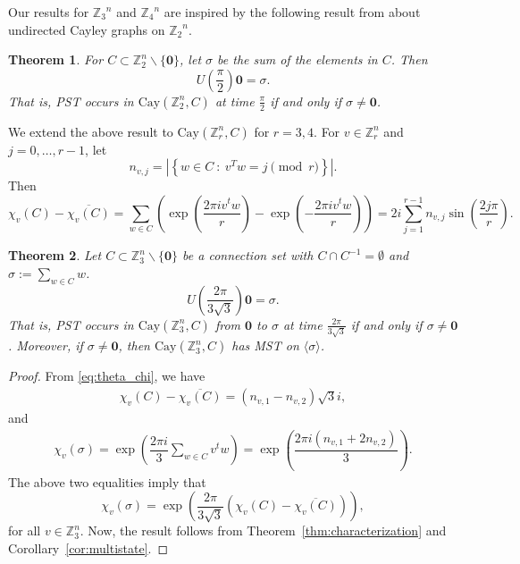 \documentclass{amsart}
\theoremstyle{plain}
\newtheorem{theorem}{Theorem}[section]
\theoremstyle{remark}\newtheorem{con}[theorem]{Construction}
\theoremstyle{remark} \newtheorem*{remark}{Remark}
\theoremstyle{remark} \newtheorem{example}{Example}
\newcommand{\bb}{\mathbb}
\newcommand{\mrm}{\mathrm}
\newcommand{\mbf}{\mathbf}
\newcommand{\ov}{\overline}
\begin{document}
Our results for ${\mathbb Z_3}^n$ and ${\mathbb Z_4}^n$
are inspired by the following result from \cite{CheungGodsil} about undirected Cayley graphs on  ${\mathbb Z_2}^n$.
\begin{theorem}
For $C \subset \bb{Z}_2^n \backslash \{\mbf{0}\}$, let $\sigma$ be the sum of the elements in $C$.  Then 
\begin{equation*}
    U\left(\frac{\pi}{2}\right) \mbf{0} = \sigma.
\end{equation*}
That is, PST occurs  in $\mrm{Cay}(\bb{Z}_2^n, C)$ at time $\frac{\pi}{2}$ if and only if $\sigma \neq \mbf{0}$.
\end{theorem}
We extend the above result to $\mrm{Cay}\left(\bb{Z}_r^n, C\right)$ for $r=3, 4$.
For $v\in \bb{Z}_r^n$ and $j=0,\ldots,r-1$, let
\begin{equation*}
    n_{v,j} = \left\vert \left\{w \in C \ :\ v^Tw = j \pmod{r}\right\}\right\vert.
\end{equation*}
Then
\begin{equation}\label{eq:theta_chi}
  \chi_{v}(C)-\ov{\chi_{v}(C)} =\sum\limits_{ w \in C} \left(\exp\left( \dfrac{2\pi i v^{t}w}{r} \right)- \exp\left(-\dfrac{2\pi i v^{t}w}{r}\right) \right)= 2 i \sum_{j=1}^{r-1}  n_{v,j} \sin\left(\dfrac{2j \pi}{r}\right).  
\end{equation}
\begin{theorem}
Let $C \subset \bb{Z}_{3}^{n} \backslash \{\mbf{0}\}$ be a connection set with $C \cap C^{-1}=\emptyset$ and $\sigma:=\sum\limits_{w \in C} w$. 
\begin{equation*}
    U\left(\frac{2\pi}{3\sqrt{3}}\right) \mbf{0} = \sigma.
\end{equation*}
That is, PST occurs in $\mrm{Cay}(\bb{Z}_3^n, C)$ from $\mbf{0}$ to $\sigma$ at time $\frac{2\pi}{3\sqrt{3}}$ if and only if $\sigma \neq \mbf{0}$. 
Moreover, if $\sigma \neq \mbf{0}$, then $\mrm{Cay}(\bb{Z}_3^n, C)$ has MST on $\langle \sigma\rangle$.
\end{theorem}  
\begin{proof}
From \eqref{eq:theta_chi}, we have
\begin{align*}
\chi_{v}(C)-\ov{\chi_{v}(C)} =  \left( n_{v,1}-n_{v,2} \right) \sqrt{3} i,
\end{align*}
and
\begin{align*}
\chi_{v}(\sigma)  =\exp\left( \dfrac{2\pi i}{3} \sum\limits_{w \in C } v^{t}w \right) 
 = \exp\left( \dfrac{2\pi i \left( n_{v,1}+2n_{v,2} \right) } {3} \right). 
\end{align*}
The above two equalities imply that
\[\chi_{v}(\sigma) = \exp\left( \dfrac{2\pi}{3\sqrt{3}} \left(\chi_{v}(C)-\ov{\chi_{v}(C)}\right) \right),\] 
for all $v \in \bb{Z}_{3}^{n}$. Now, the result follows from Theorem~\ref{thm:characterization} and Corollary~\ref{cor:multistate}. 
\end{proof}
\end{document}
